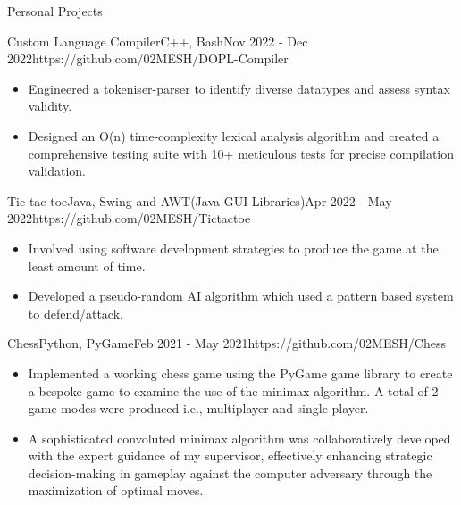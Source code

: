 \documentclass[11pt]{article}
\newlength{\secsep}
\newlength{\seperate}
\newcommand{\coloredhrulefill}[2][black]{%
    \leavevmode%
    \leaders\hbox{\textcolor{#1}{\rule{1ex}{0.5pt}}}\hfill\kern0pt%
}
\newcommand{\lineunder}{\vspace*{-8pt} \hspace*{-6pt} \coloredhrulefill[contactgrey]{}  \\* \vspace*{-8pt}}
\newenvironment{tabbedList}[1]{
	\begin{list}{}{
      \setlength{\itemsep}{0pt}
      \setlength{\labelsep}{0pt}
      \setlength{\labelwidth}{0pt}
      \setlength{\leftmargin}{0pt}
      \setlength{\rightmargin}{0pt}
      \setlength{\listparindent}{0pt}
      \setlength{\parsep}{0pt}
      \setlength{\parskip}{0pt}
      \setlength{\partopsep}{0pt}
      \setlength{\topsep}{#1}
	}
	\item[]
}{\end{list}}
\newenvironment{resume_section}[1] {
	\filbreak
	\vspace{1\secsep}
	\textsc{\Large\textcolor{darkblue}{#1}} \lineunder \vspace*{0.5\secsep}
	\begin{tabbedList}{\secsep}
}{\end{tabbedList}}
\newenvironment{personal_projects}[4] {
	\textbf{#1} \hfill \href{#4}{\color{darkblue}{\faGithub{\footnotesize \hspace*{\secsep}Project Link}}}\\*  %
	{\small Tech Stack: #2} \hfill {\footnotesize \textit{\color{contactgrey}{#3}}}\vspace*{1px}
	
	\begin{tabbedList}{0pt}
}{\end{tabbedList}\vspace*{0.8\secsep}}
\newenvironment{subitems}{
	\vspace*{-2px}
	\renewcommand{\labelitemi}{\color{contactgrey}{\faCode}}
	\begin{itemize}
		\setlength{\labelsep}{0.5em}
		\setlength{\itemsep}{0pt}
		\setlength{\parsep}{0pt}
		\setlength{\topsep}{0px}
}{\end{itemize}}
\begin{document}
\begin{resume_section}{Personal Projects}
		\begin{personal_projects} {Custom Language Compiler}{C++, Bash}{Nov 2022 - Dec 2022}{https://github.com/02MESH/DOPL-Compiler}
			\begin{subitems}
				\item{Engineered a tokeniser-parser to identify diverse datatypes and assess syntax validity.}
				\item{Designed an O(n) time-complexity lexical analysis algorithm and created a comprehensive testing suite with 10+ meticulous tests for precise compilation validation.}
			\end{subitems}
		\end{personal_projects}
		
		\vspace*{\seperate}	
	
		\begin{personal_projects} {Tic-tac-toe}{Java, Swing and AWT(Java GUI Libraries)}{Apr 2022 - May 2022}{https://github.com/02MESH/Tictactoe}
			\begin{subitems}
				\item{Involved using software development strategies to produce the game at the least amount of time.}
				\item{Developed a pseudo-random AI algorithm which used a pattern based system to defend/attack.}
			\end{subitems}
		\end{personal_projects}
		
		\vspace*{\seperate}	
	
		\begin{personal_projects} {Chess}{Python, PyGame}{Feb 2021 - May 2021}{https://github.com/02MESH/Chess}
			\begin{subitems}
				\item{Implemented a working chess game using the PyGame game library to create a bespoke game to examine the use of the minimax algorithm. A total of 2 game modes were produced i.e., multiplayer and single-player.}
				\item{A sophisticated convoluted minimax algorithm was collaboratively developed with the expert guidance of my supervisor, effectively enhancing strategic decision-making in gameplay against the computer adversary through the maximization of optimal moves.}
			\end{subitems}
		\end{personal_projects}
		
	\end{resume_section}
\end{document}
